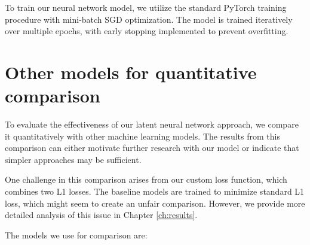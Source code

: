 To train our neural network model, we utilize the standard PyTorch training procedure with mini-batch \acrfull{SGD} optimization. The model is trained iteratively over multiple epochs, with early stopping implemented to prevent overfitting.


\section{Other models for quantitative comparison}

To evaluate the effectiveness of our latent neural network approach, we compare it quantitatively with other machine learning models. The results from this comparison can either motivate further research with our model or indicate that simpler approaches may be sufficient.

One challenge in this comparison arises from our custom loss function, which combines two L1 losses. The baseline models are trained to minimize standard L1 loss, which might seem to create an unfair comparison. However, we provide more detailed analysis of this issue in Chapter \ref{ch:results}.

The models we use for comparison are:

